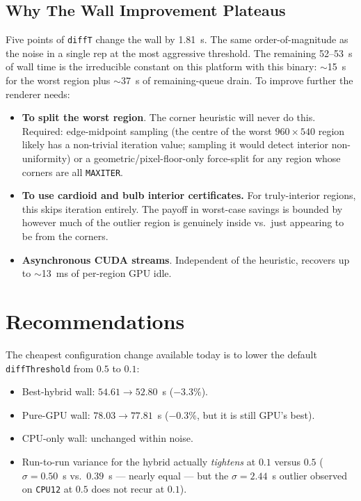 \documentclass[
	english,
	letterpaper, oneside
]{article}
\begin{document}
\subsection{Why The Wall Improvement Plateaus}

Five points of \texttt{diffT} change the wall by 1.81~s. The same
order-of-magnitude as the noise in a single rep at the most aggressive
threshold. The remaining 52--53~s of wall time is the irreducible
constant on this platform with this binary: $\sim$15~s for the worst
region plus $\sim$37~s of remaining-queue drain. To improve further
the renderer needs:

\begin{itemize}
    \item \textbf{To split the worst region}. The corner heuristic
    will never do this. Required: edge-midpoint sampling (the centre
    of the worst $960 \times 540$ region likely has a non-trivial
    iteration value; sampling it would detect interior non-uniformity)
    or a geometric/pixel-floor-only force-split for any region whose
    corners are all \texttt{MAXITER}.
    \item \textbf{To use cardioid and bulb interior certificates.} For
    truly-interior regions, this skips iteration entirely. The
    payoff in worst-case savings is bounded by however much of the
    outlier region is genuinely inside vs.\ just appearing to be from
    the corners.
    \item \textbf{Asynchronous CUDA streams}. Independent of the
    heuristic, recovers up to $\sim$13~ms of per-region GPU idle.
\end{itemize}

\section{Recommendations}

The cheapest configuration change available today is to lower the
default \texttt{diffThreshold} from $0.5$ to $0.1$:

\begin{itemize}
    \item Best-hybrid wall: $54.61 \to 52.80$~s ($-3.3\%$).
    \item Pure-GPU wall: $78.03 \to 77.81$~s ($-0.3\%$, but it is
    still GPU's best).
    \item CPU-only wall: unchanged within noise.
    \item Run-to-run variance for the hybrid actually \emph{tightens}
    at $0.1$ versus $0.5$ ($\sigma = 0.50$~s vs.\ $0.39$~s --- nearly
    equal --- but the $\sigma = 2.44$~s outlier observed on
    \texttt{CPU12} at $0.5$ does not recur at $0.1$).
\end{itemize}
\end{document}
